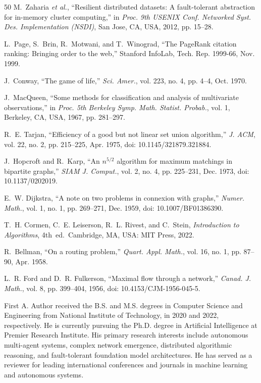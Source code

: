 \documentclass{ieeeaccess}
\begin{document}
\begin{thebibliography}{50}
M.~Zaharia \emph{et al.}, ``Resilient distributed datasets: A fault-tolerant abstraction for in-memory cluster computing,'' in \emph{Proc. 9th USENIX Conf. Networked Syst. Des. Implementation (NSDI)}, San Jose, CA, USA, 2012, pp. 15--28.

L.~Page, S.~Brin, R.~Motwani, and T.~Winograd, ``The PageRank citation ranking: Bringing order to the web,'' Stanford InfoLab, Tech. Rep. 1999-66, Nov. 1999.

J.~Conway, ``The game of life,'' \emph{Sci. Amer.}, vol. 223, no. 4, pp. 4--4, Oct. 1970.

J.~MacQueen, ``Some methods for classification and analysis of multivariate observations,'' in \emph{Proc. 5th Berkeley Symp. Math. Statist. Probab.}, vol. 1, Berkeley, CA, USA, 1967, pp. 281--297.

R.~E. Tarjan, ``Efficiency of a good but not linear set union algorithm,'' \emph{J. ACM}, vol. 22, no. 2, pp. 215--225, Apr. 1975, doi: 10.1145/321879.321884.

J.~Hopcroft and R.~Karp, ``An $n^{5/2}$ algorithm for maximum matchings in bipartite graphs,'' \emph{SIAM J. Comput.}, vol. 2, no. 4, pp. 225--231, Dec. 1973, doi: 10.1137/0202019.

E.~W. Dijkstra, ``A note on two problems in connexion with graphs,'' \emph{Numer. Math.}, vol. 1, no. 1, pp. 269--271, Dec. 1959, doi: 10.1007/BF01386390.

T.~H. Cormen, C.~E. Leiserson, R.~L. Rivest, and C.~Stein, \emph{Introduction to Algorithms}, 4th~ed.\ Cambridge, MA, USA: MIT Press, 2022.

R.~Bellman, ``On a routing problem,'' \emph{Quart. Appl. Math.}, vol. 16, no. 1, pp. 87--90, Apr. 1958.

L.~R. Ford and D.~R. Fulkerson, ``Maximal flow through a network,'' \emph{Canad. J. Math.}, vol. 8, pp. 399--404, 1956, doi: 10.4153/CJM-1956-045-5.

\end{thebibliography}

\begin{IEEEbiographynophoto}{First A. Author}
received the B.S. and M.S. degrees in Computer Science and Engineering from National Institute of Technology, in 2020 and 2022, respectively. He is currently pursuing the Ph.D. degree in Artificial Intelligence at Premier Research Institute. His primary research interests include autonomous multi-agent systems, complex network emergence, distributed algorithmic reasoning, and fault-tolerant foundation model architectures. He has served as a reviewer for leading international conferences and journals in machine learning and autonomous systems.
\end{IEEEbiographynophoto}
\end{document}
